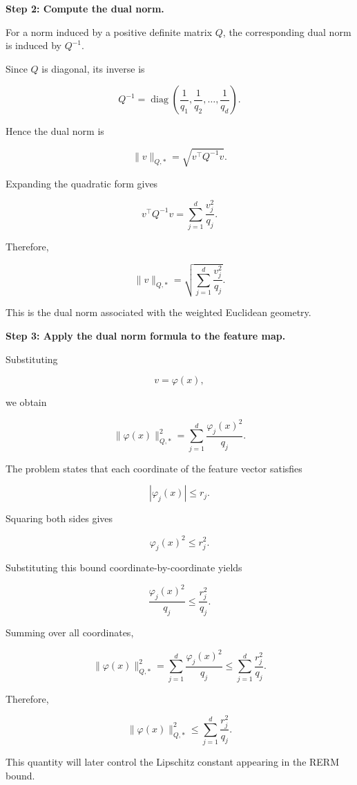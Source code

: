 \documentclass[11pt]{article}
\begin{document}
\begin{enumerate}
\begin{solutionbox}
\medskip

\textbf{Step 2: Compute the dual norm.}

For a norm induced by a positive definite matrix \(Q\), the corresponding dual norm is induced by \(Q^{-1}\).

Since \(Q\) is diagonal, its inverse is

\[
Q^{-1}
=
\operatorname{diag}
\left(
\frac1{q_1},
\frac1{q_2},
\ldots,
\frac1{q_d}
\right).
\]

Hence the dual norm is

\[
\|v\|_{Q,*}
=
\sqrt{
v^\top Q^{-1}v
}.
\]

Expanding the quadratic form gives

\[
v^\top Q^{-1}v
=
\sum_{j=1}^{d}
\frac{v_j^2}{q_j}.
\]

Therefore,

\[
\boxed{
\|v\|_{Q,*}
=
\sqrt{
\sum_{j=1}^{d}
\frac{v_j^2}{q_j}
}.
}
\]

This is the dual norm associated with the weighted Euclidean geometry.

\medskip

\textbf{Step 3: Apply the dual norm formula to the feature map.}

Substituting

\[
v=\varphi(x),
\]

we obtain

\[
\|\varphi(x)\|_{Q,*}^2
=
\sum_{j=1}^{d}
\frac{\varphi_j(x)^2}{q_j}.
\]

The problem states that each coordinate of the feature vector satisfies

\[
|\varphi_j(x)|
\le
r_j.
\]

Squaring both sides gives

\[
\varphi_j(x)^2
\le
r_j^2.
\]

Substituting this bound coordinate-by-coordinate yields

\[
\frac{\varphi_j(x)^2}{q_j}
\le
\frac{r_j^2}{q_j}.
\]

Summing over all coordinates,

\[
\|\varphi(x)\|_{Q,*}^2
=
\sum_{j=1}^{d}
\frac{\varphi_j(x)^2}{q_j}
\le
\sum_{j=1}^{d}
\frac{r_j^2}{q_j}.
\]

Therefore,

\[
\boxed{
\|\varphi(x)\|_{Q,*}^2
\le
\sum_{j=1}^{d}
\frac{r_j^2}{q_j}.
}
\]

This quantity will later control the Lipschitz constant appearing in the RERM bound.

\medskip


\end{solutionbox}
\end{enumerate}
\end{document}
